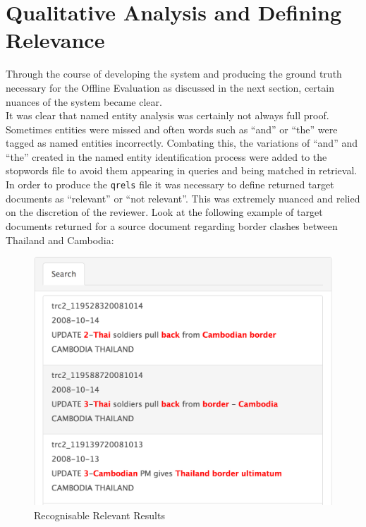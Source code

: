 \documentclass{l4proj}
\newcommand{\code}[1]{\texttt{#1}}
\begin{document}
\section{Qualitative Analysis and Defining Relevance}
Through the course of developing the system and producing the ground truth necessary for the Offline Evaluation as discussed in the next section, certain nuances of the system became clear. \\
It was clear that named entity analysis was certainly not always full proof. Sometimes entities were missed and often words such as ``and'' or ``the'' were tagged as named entities incorrectly. Combating this, the variations of ``and'' and ``the'' created in the named entity identification process were added to the stopwords file to avoid them appearing in queries and being matched in retrieval. \\
In order to produce the \code{qrels} file it was necessary to define returned target documents as ``relevant'' or ``not relevant''. This was extremely nuanced and relied on the discretion of the reviewer. Look at the following example of target documents returned for a source document regarding border clashes between Thailand and Cambodia:
\begin{figure}[H]
\centering
\includegraphics[scale=0.30]{images/good_results}
\caption{Recognisable Relevant Results}
\label{relevant_results}
\end{figure}
\end{document}
